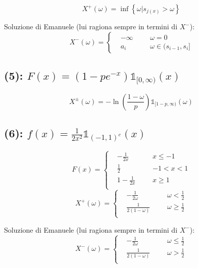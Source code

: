 \documentclass{article}
\begin{document}
\[
	X^+ (\omega) = \inf\left\{\omega | s_{j(x)} > \omega\right\}
\]

Soluzione di Emanuele (lui ragiona sempre in termini di $X^-$):
\[
	X^-(\omega ) = \left\{\begin{aligned}
		&-\infty &&& \omega =0\\
		& a_i & & & \omega \in (s_{i-1}, s_i]
	\end{aligned}\right.
\]

\subsection{(5): $F(x) = \left(1- pe^{-x}\right) \mathds{1}_{[0, \infty )}(x)$}
\[
	X^\pm\left(\omega\right) = - \ln\left(\frac{1-\omega}{p}\right) \mathds{1}_{[1-p,\infty )}(\omega)
\]

\subsection{(6): $f(x) = \frac{1}{2x^2} \mathds{1}_{(-1,1)^c}(x)$}
\[
	F(x) = \left\{\begin{aligned}
		&-\frac{1}{2x} & & & x\leq -1\\
		& \frac{1}{2} & & & -1<x<1\\
		& 1-\frac{1}{2x} & & & x\geq 1\\
	\end{aligned}\right.
\]
\[
	X^+(\omega ) = \left\{\begin{aligned}
		&-\frac{1}{2\omega }& & & \omega <\frac{1}{2}\\
		& \frac{1}{2(1-\omega )}& & & \omega \geq \frac{1}{2}\\
	\end{aligned}\right.
\]

Soluzione di Emanuele (lui ragiona sempre in termini di $X^-$):
\[
	X^-(\omega ) = \left\{\begin{aligned}
		&-\frac{1}{2\omega }& & & \omega \leq \frac{1}{2}\\
		& \frac{1}{2(1-\omega )}& & & \omega > \frac{1}{2}\\
	\end{aligned}\right.
\]
\end{document}
